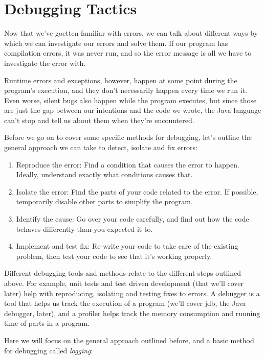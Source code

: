 \section{Debugging Tactics}

Now that we've goetten familiar with errors, we can talk about different ways by which we can investigate our errors and solve them. If our program has compilation errors, it was never run, and so the error message is all we have to investigate the error with.

Runtime errors and exceptions, however, happen at some point during the program's execution, and they don't necessarily happen every time we run it. Even worse, silent bugs also happen while the program executes, but since those are just the gap between our intentions and the code we wrote, the Java language can't stop and tell us about them when they're encountered.

Before we go on to cover some specific methods for debugging, let's outline the general approach we can take to detect, isolate and fix errors:

\begin{enumerate}
\item Reproduce the error: Find a condition that causes the error to happen. Ideally, understand exactly what conditions causes that.
\item Isolate the error: Find the parts of your code related to the error. If possible, temporarily disable other parts to simplify the program.
\item Identify the cause: Go over your code carefully, and find out how the code behaves differently than you expected it to.
\item Implement and test fix: Re-write your code to take care of the existing problem, then test your code to see that it's working properly.
\end{enumerate}

Different debugging tools and methods relate to the different steps outlined above. For example, unit tests and test driven development (that we'll cover later) help with reproducing, isolating and testing fixes to errors. A debugger is a tool that helps us track the execution of a program (we'll cover jdb, the Java debugger, later), and a profiler helps track the memory consumption and running time of parts in a program.

Here we will focus on the general approach outlined before, and a basic method for debugging called \emph{logging}:

